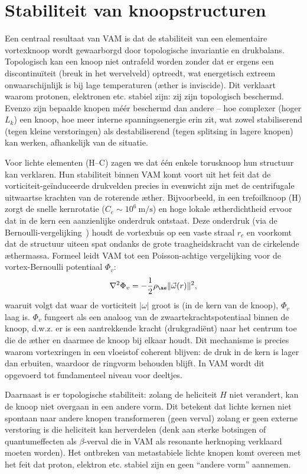 \section{Stabiliteit van knoopstructuren}

Een centraal resultaat van VAM is dat de stabiliteit van een elementaire vortexknoop wordt gewaarborgd door topologische invariantie en drukbalans. Topologisch kan een knoop niet ontrafeld worden zonder dat er ergens een discontinuïteit (breuk in het wervelveld) optreedt, wat energetisch extreem onwaarschijnlijk is bij lage temperaturen (æther is inviscide). Dit verklaart waarom protonen, elektronen etc. stabiel zijn: zij zijn topologisch beschermd. Evenzo zijn bepaalde knopen méér beschermd dan andere – hoe complexer (hoger $L_k$) een knoop, hoe meer interne spanningsenergie erin zit, wat zowel stabiliserend (tegen kleine verstoringen) als destabiliserend (tegen splitsing in lagere knopen) kan werken, afhankelijk van de situatie.

Voor lichte elementen (H–C) zagen we dat één enkele torusknoop hun structuur kan verklaren. Hun stabiliteit binnen VAM komt voort uit het feit dat
de vorticiteit-geïnduceerde drukvelden precies in evenwicht zijn met de centrifugale uitwaartse krachten van de roterende æther. Bijvoorbeeld, in een trefoilknoop (H) zorgt de snelle kernrotatie ($C_e \sim10^6~\text{m/s}$) en hoge lokale ætherdichtheid ervoor dat in de kern een aanzienlijke onderdruk ontstaat. Deze onderdruk (via de Bernoulli-vergelijking~\cite{Ricca1992EnergyHelicity}) houdt de vortexbuis op een vaste straal $r_c$ en voorkomt dat de structuur uiteen spat ondanks de grote traagheidskracht van de cirkelende æthermassa. Formeel leidt VAM tot een Poisson-achtige vergelijking voor de vortex-Bernoulli potentiaal $\Phi_v$:
\begin{equation}
    \nabla^2 \Phi_v = -\frac{1}{2}\rho_{\ae} \| \vec{\omega}(r) \|^2,
\end{equation}
waaruit volgt dat waar de vorticiteit $|\omega|$ groot is (in de kern van de knoop), $\Phi_v$ laag is. $\Phi_v$ fungeert als een analoog van de zwaartekrachtspotentiaal binnen de knoop, d.w.z. er is een aantrekkende kracht (drukgradiënt) naar het centrum toe die de æther en daarmee de knoop bij elkaar houdt. Dit mechanisme is precies waarom vortexringen in een vloeistof coherent blijven: de druk in de kern is lager dan erbuiten, waardoor de ringvorm behouden blijft. In VAM wordt dit opgevoerd tot fundamenteel niveau voor deeltjes.

Daarnaast is er topologische stabiliteit: zolang de heliciteit $H$ niet verandert, kan de knoop niet overgaan in een andere vorm. Dit betekent dat lichte kernen niet spontaan naar andere knopen transformeren (geen verval) zolang er geen externe verstoring is die heliciteit kan herverdelen (denk aan sterke botsingen of quantumeffecten als $\beta$-verval die in VAM als resonante herknoping verklaard moeten worden). Het ontbreken van metastabiele lichte knopen komt overeen met het feit dat proton, elektron etc. stabiel zijn en geen “andere vorm” aannemen.